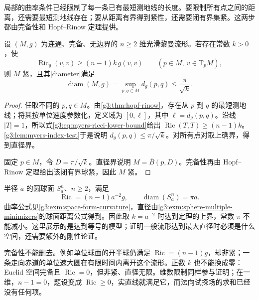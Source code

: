 局部的曲率条件已经限制了每一条已有最短测地线的长度。要限制所有点之间的距离，还需要最短测地线存在；要从距离有界得到紧性，还需要闭有界集紧。这两步都由完备性和 Hopf--Rinow 定理提供。

\begin{theorem}\label{g3:thm:bonnet-myers}
	设 \((M,g)\) 为连通、完备、无边界的 \(n\ge2\) 维光滑黎曼流形。若存在常数 \(k>0\)，使
	\begin{equation}\label{g3:eq:myers-ricci-lower-bound}
		\operatorname{Ric}_g(v,v)\ge(n-1)k\,g(v,v)
		\qquad(p\in M,\ v\in\mathrm{T}_pM),
	\end{equation}
	则 \(M\) 紧，且其[diameter]满足
	\begin{equation}\label{g3:eq:bonnet-myers-diameter}
		\operatorname{diam}(M,g)
		=\sup_{p,q\in M}d_g(p,q)\le\frac\pi{\sqrt{k}}.
	\end{equation}
\end{theorem}
\begin{proof}
	任取不同的 \(p,q\in M\)。由\cref{g3:thm:hopf-rinow}，存在从 \(p\) 到 \(q\) 的最短测地线；将其按单位速度参数化，定义域为 \([0,\ell]\)，其中 \(\ell=d_g(p,q)\)。沿线 \(|T|=1\)，所以式\eqref{g3:eq:myers-ricci-lower-bound}给出 \(\operatorname{Ric}(T,T)\ge(n-1)k\)。\cref{g3:lem:myers-index-test}于是说明 \(d_g(p,q)\le\pi/\sqrt{k}\)。对所有点对取上确界，得到直径界。

	固定 \(p\in M\)，令 \(D=\pi/\sqrt{k}\)。直径界说明 \(M=\overline B(p,D)\)。完备性再由 Hopf--Rinow 定理给出该闭有界球紧，因此 \(M\) 紧。
\end{proof}

\begin{example}\label{g3:exm:myers-sharp-sphere}
	半径 \(a\) 的圆球面 \(S_a^n\)、\(n\ge2\)，满足
	\[
		\operatorname{Ric}=(n-1)a^{-2}g,
		\qquad\operatorname{diam}(S_a^n)=\pi a.
	\]
	曲率公式见\cref{g3:exm:space-form-curvature}，直径由\cref{g3:exm:sphere-multiple-minimizers}的球面距离公式得到。因此取 \(k=a^{-2}\) 时达到定理的上界，常数 \(\pi\) 不能减小。这里展示的是达到等号的模型；证明一般流形达到最大直径时必须是什么空间，还需要额外的刚性论证。
\end{example}

完备性不能删去。例如单位球面的开半球仍满足 \(\operatorname{Ric}=(n-1)g\)，却非紧；一条走向赤道的单位速大圆在有限时间内离开这个流形。正数 \(k\) 也不能换成零：Euclid 空间完备且 \(\operatorname{Ric}=0\)，但非紧、直径无限。维数限制同样参与证明；在一维，\(n-1=0\)，题设变成 \(\operatorname{Ric}\ge0\)，实直线就满足它，而法向试探场的求和已经没有任何项。

